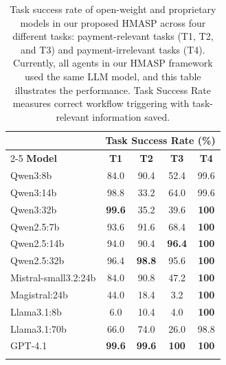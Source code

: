 \documentclass[runningheads]{llncs}
\begin{document}
\begin{table}[!h]
    \centering
    \renewcommand{\arraystretch}{1.0}
    \setlength{\tabcolsep}{2.5mm}
    \begin{tabular}{l c c c c}
        \toprule
        & \multicolumn{4}{c}{\textbf{Task Success Rate (\%)}} \\
        \cmidrule(lr){2-5} 
        \textbf{Model} & \textbf{T1} & \textbf{T2} & \textbf{T3} & \textbf{T4} \\
        \midrule
        Qwen3:8b & 84.0 & 90.4 & 52.4 & 99.6 \\
        Qwen3:14b & 98.8 & 33.2 & 64.0 & 99.6 \\
        Qwen3:32b & \textbf{99.6} & 35.2 & 39.6 & \textbf{100} \\
        
        \addlinespace[3pt]
        Qwen2.5:7b & 93.6 & 91.6 & 68.4 & \textbf{100} \\
        Qwen2.5:14b & 94.0 & 90.4 & \textbf{96.4} & \textbf{100} \\
        Qwen2.5:32b & 96.4 & \textbf{98.8} & 95.6 & \textbf{100} \\
        
        \addlinespace[3pt]
        Mistral-small3.2:24b & 84.0 & 90.8 & 47.2 & \textbf{100} \\
        Magistral:24b & 44.0 & 18.4 & 3.2 & \textbf{100} \\
        
        \addlinespace[3pt]
        Llama3.1:8b & 6.0 & 10.4 & 4.0 & \textbf{100} \\
        Llama3.1:70b & 66.0 & 74.0 & 26.0 & 98.8 \\
        \midrule
        GPT-4.1 & \textbf{99.6} & \textbf{99.6} & \textbf{100} & \textbf{100}\\
        \addlinespace[3pt]
        
        \bottomrule
        \\
    \end{tabular}
    \caption{Task success rate of open-weight and proprietary models in our proposed HMASP across four different tasks: payment-relevant tasks (T1, T2, and T3) and payment-irrelevant tasks (T4). Currently, all agents in our HMASP framework used the same LLM model, and this table illustrates the performance. Task Success Rate measures correct workflow triggering with task-relevant information saved. 
    }
    \label{tab:eval_task_performance}
\end{table}
\end{document}
